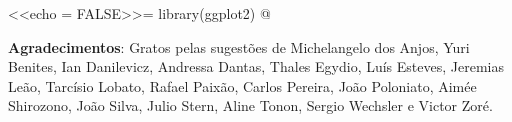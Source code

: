 



<<echo = FALSE>>=
library(ggplot2)
@


\maketitle

\vspace{20mm}

\textbf{Agradecimentos}: Gratos pelas sugestões de
Michelangelo dos Anjos, Yuri Benites, Ian Danilevicz, Andressa Dantas, Thales Egydio, Luís Esteves, Jeremias Leão, Tarcísio Lobato, Rafael Paixão, Carlos Pereira, João Poloniato,  Aimée Shirozono, João Silva, Julio Stern, Aline Tonon, Sergio Wechsler e Victor Zoré.

\newpage
 
\tableofcontents
  
\newpage


























